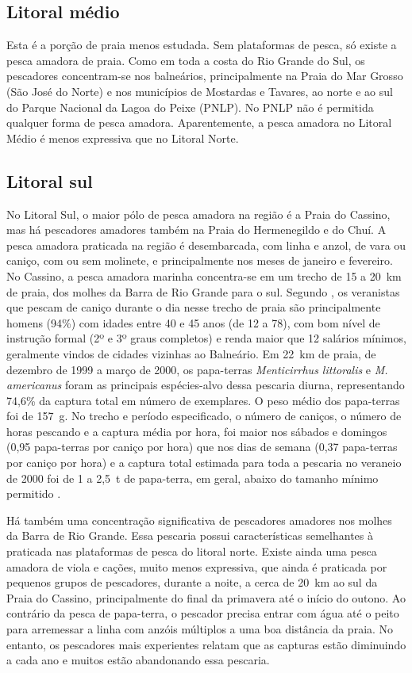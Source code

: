 \documentclass[a4paper,11pt,twoside,showtrims,onecolumn,openright,final]{memoir}
\begin{document}
\subsection*{Litoral médio}

Esta é a porção de praia menos estudada. Sem plataformas de pesca, só existe a pesca 
amadora de praia. Como em toda a costa do Rio Grande do Sul, os pescadores 
concentram-se nos balneários, principalmente na Praia do Mar Grosso (São José do Norte) 
e nos municípios de Mostardas e Tavares, ao norte e ao sul do Parque Nacional da Lagoa do Peixe (PNLP). 
No PNLP não é permitida qualquer forma de pesca amadora. Aparentemente, a pesca amadora 
no Litoral Médio é menos expressiva que no Litoral Norte. 

\subsection*{Litoral sul}

No Litoral Sul, o maior pólo de pesca amadora na região é a Praia do Cassino, mas há pescadores amadores
também na Praia do Hermenegildo e do Chuí. A pesca amadora praticada na região é desembarcada, com linha 
e anzol, de vara ou caniço, com ou sem molinete, e principalmente nos meses de janeiro e fevereiro. 
No Cassino, a pesca amadora marinha concentra-se em um trecho de 15 a 20~km de praia, dos molhes da Barra 
de Rio Grande para o sul. Segundo \citet{dapper2000}, os veranistas 
que pescam de caniço durante o dia nesse trecho de praia são principalmente homens (94\%) 
com idades entre 40 e 45 anos (de 12 a 78), com bom nível de instrução formal 
(2º e 3º graus completos) e renda maior que 12 salários mínimos, geralmente vindos de 
cidades vizinhas ao Balneário. Em 22~km de praia, de dezembro de 1999 a março de 2000, 
os papa-terras \emph{Menticirrhus littoralis} e \emph{M. americanus} foram as principais espécies-alvo 
dessa pescaria diurna, representando 74,6\% da captura total em número de exemplares. O peso médio dos 
papa-terras foi de 157~g. No trecho e período especificado, o número de caniços, o número de 
horas pescando e a captura média por hora, foi maior nos sábados e domingos 
(0,95 papa-terras por caniço por hora) que nos dias de semana (0,37 papa-terras por caniço por hora) 
e a captura total estimada para toda a pescaria no veraneio de 2000 foi de 1 a 2,5~t de papa-terra, 
em geral, abaixo do tamanho mínimo permitido \citep{vieira2000}. 

Há também uma concentração significativa de pescadores amadores nos molhes da Barra de Rio Grande.
Essa pescaria possui características semelhantes à praticada nas plataformas de pesca 
do litoral norte. Existe ainda uma pesca amadora de viola e cações, muito menos expressiva, 
que ainda é praticada por pequenos grupos de pescadores, durante a noite, a cerca de 20~km ao sul da 
Praia do Cassino, principalmente do final da primavera até o início do outono. Ao contrário da pesca 
de papa-terra, o pescador precisa entrar com água até o peito para arremessar a linha com anzóis múltiplos 
a uma boa distância da praia. No entanto, os pescadores mais experientes relatam que as capturas 
estão diminuindo a cada ano e muitos estão abandonando essa pescaria.
\end{document}
